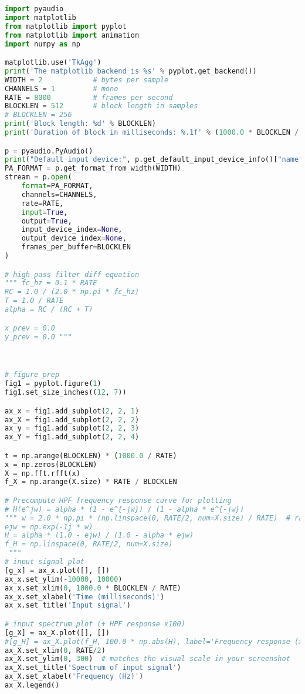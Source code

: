 \documentclass[11pt]{article}
\begin{document}
\begin{lstlisting}[language=python, label={lst:code}, breaklines=true, caption={example code}]
import pyaudio
import matplotlib
from matplotlib import pyplot
from matplotlib import animation
import numpy as np

matplotlib.use('TkAgg')
print('The matplotlib backend is %s' % pyplot.get_backend())
WIDTH = 2            # bytes per sample
CHANNELS = 1         # mono
RATE = 8000          # frames per second
BLOCKLEN = 512       # block length in samples
# BLOCKLEN = 256
print('Block length: %d' % BLOCKLEN)
print('Duration of block in milliseconds: %.1f' % (1000.0 * BLOCKLEN / RATE))

p = pyaudio.PyAudio()
print("Default input device:", p.get_default_input_device_info()["name"])
PA_FORMAT = p.get_format_from_width(WIDTH)
stream = p.open(
    format=PA_FORMAT,
    channels=CHANNELS,
    rate=RATE,
    input=True,          
    output=True,         
    input_device_index=None, 
    output_device_index=None,
    frames_per_buffer=BLOCKLEN
)

# high pass filter diff equation
""" fc_hz = 0.1 * RATE   
RC = 1.0 / (2.0 * np.pi * fc_hz)
T = 1.0 / RATE
alpha = RC / (RC + T)

x_prev = 0.0
y_prev = 0.0 """



# figure prep
fig1 = pyplot.figure(1)
fig1.set_size_inches((12, 7)) 

ax_x = fig1.add_subplot(2, 2, 1)
ax_X = fig1.add_subplot(2, 2, 2)
ax_y = fig1.add_subplot(2, 2, 3)
ax_Y = fig1.add_subplot(2, 2, 4)

t = np.arange(BLOCKLEN) * (1000.0 / RATE)  
x = np.zeros(BLOCKLEN)                     
X = np.fft.rfft(x)                         
f_X = np.arange(X.size) * RATE / BLOCKLEN  

# Precompute HPF frequency response curve for plotting 
# H(e^jw) = alpha * (1 - e^{-jw}) / (1 - alpha * e^{-jw})
""" w = 2.0 * np.pi * (np.linspace(0, RATE/2, num=X.size) / RATE)  # rad/sample
ejw = np.exp(-1j * w)
H = alpha * (1.0 - ejw) / (1.0 - alpha * ejw)
f_H = np.linspace(0, RATE/2, num=X.size)
 """
# input signal plot
[g_x] = ax_x.plot([], [])
ax_x.set_ylim(-10000, 10000)
ax_x.set_xlim(0, 1000.0 * BLOCKLEN / RATE)
ax_x.set_xlabel('Time (milliseconds)')
ax_x.set_title('Input signal')

# input spectrum plot (+ HPF response x100)
[g_X] = ax_X.plot([], [])
#[g_H] = ax_X.plot(f_H, 100.0 * np.abs(H), label='Frequency response (x100)', color='green')
ax_X.set_xlim(0, RATE/2)
ax_X.set_ylim(0, 300)  # matches the visual scale in your screenshot
ax_X.set_title('Spectrum of input signal')
ax_X.set_xlabel('Frequency (Hz)')
ax_X.legend()


\end{lstlisting}
\end{document}
